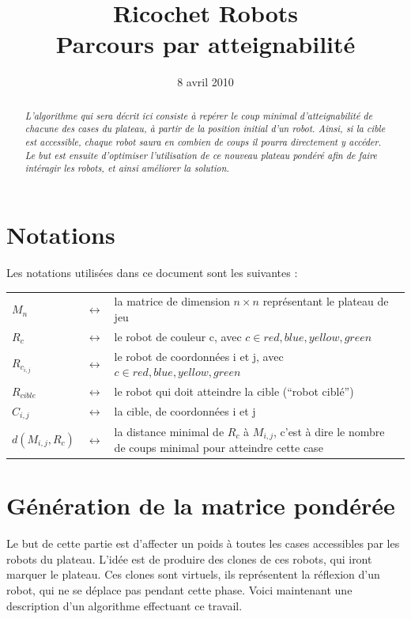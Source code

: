 \documentclass[a4paper,11pt]{article}
\title{Ricochet Robots\\Parcours par atteignabilit\'e}
\date{8 avril 2010}
\newcommand{\Abstract}[1]{\begin{abstract}\textit{#1}\end{abstract}\vspace{-1cm}}
\begin{document}
\maketitle
\thispagestyle{empty}
\pagenumbering{}
\vfill
\Abstract{
 L'algorithme qui sera d\'ecrit ici consiste \`a rep\'erer le coup minimal d'atteignabilit\'e de chacune des cases du plateau, \`a partir de la position initial d'un robot. Ainsi, si la cible est accessible, chaque robot saura en combien de coups il pourra directement y acc\'eder. Le but est ensuite d'optimiser l'utilisation de ce nouveau plateau pond\'er\'e afin de faire int\'eragir les robots, et ainsi am\'eliorer la solution.
}
\vfill
\newpage
{}
\section{Notations}
Les notations utilis\'ees dans ce document sont les suivantes :\\

\hspace{-2em}
\begin{tabular*}{\textwidth}{lcp{.7\linewidth}}
$M_n$ & $\leftrightarrow$ & la matrice de dimension $n \times n$ repr\'esentant le plateau de jeu\\
$R_c$ & $\leftrightarrow$ & le robot de couleur c, avec $c \in {red, blue, yellow, green}$\\
$R_{c_{i,j}}$ & $\leftrightarrow$ & le robot de coordonn\'ees i  et j, avec $c \in {red, blue, yellow, green}$\\
$R_{cible}$ & $\leftrightarrow$ & le robot qui doit atteindre la cible (``robot cibl\'e'')\\
$C_{i,j}$ & $\leftrightarrow$ & la cible, de coordonn\'ees i et j\\
$d(M_{i,j},R_c)$ & $\leftrightarrow$ & la distance minimal de $R_c$ \`a $M_{i,j}$, c'est \`a dire le nombre de coups minimal pour atteindre cette case\\

\end{tabular*}

\section{G\'en\'eration de la matrice pond\'er\'ee}
Le but de cette partie est d'affecter un poids \`a toutes les cases accessibles par les robots du plateau. L'id\'ee est de produire des clones de ces robots, qui iront marquer le plateau. Ces clones sont virtuels, ils repr\'esentent la r\'eflexion d'un robot, qui ne se d\'eplace pas pendant cette phase. Voici maintenant une description d'un algorithme effectuant ce travail.
\end{document}
